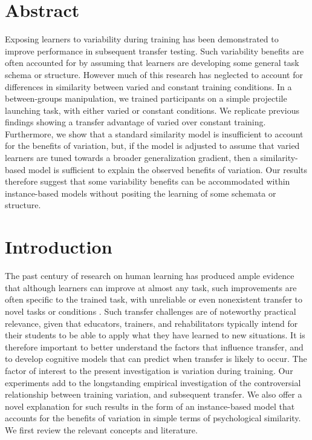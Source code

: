 \documentclass[
  12pt,
  letterpaper,
]{article}
\begin{document}
\section{Abstract}\label{abstract}

Exposing learners to variability during training has been demonstrated
to improve performance in subsequent transfer testing. Such variability
benefits are often accounted for by assuming that learners are
developing some general task schema or structure. However much of this
research has neglected to account for differences in similarity between
varied and constant training conditions. In a between-groups
manipulation, we trained participants on a simple projectile launching
task, with either varied or constant conditions. We replicate previous
findings showing a transfer advantage of varied over constant training.
Furthermore, we show that a standard similarity model is insufficient to
account for the benefits of variation, but, if the model is adjusted to
assume that varied learners are tuned towards a broader generalization
gradient, then a similarity-based model is sufficient to explain the
observed benefits of variation. Our results therefore suggest that some
variability benefits can be accommodated within instance-based models
without positing the learning of some schemata or structure.

\section{Introduction}\label{introduction}

The past century of research on human learning has produced ample
evidence that although learners can improve at almost any task, such
improvements are often specific to the trained task, with unreliable or
even nonexistent transfer to novel tasks or conditions
\autocite{barnettWhenWhereWe2002,dettermanCaseProsecutionTransfer1993}.
Such transfer challenges are of noteworthy practical relevance, given
that educators, trainers, and rehabilitators typically intend for their
students to be able to apply what they have learned to new situations.
It is therefore important to better understand the factors that
influence transfer, and to develop cognitive models that can predict
when transfer is likely to occur. The factor of interest to the present
investigation is variation during training. Our experiments add to the
longstanding empirical investigation of the controversial relationship
between training variation, and subsequent transfer. We also offer a
novel explanation for such results in the form of an instance-based
model that accounts for the benefits of variation in simple terms of
psychological similarity. We first review the relevant concepts and
literature.
\end{document}
